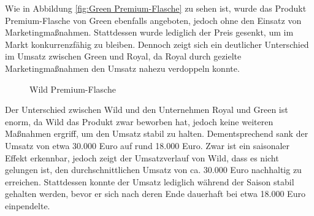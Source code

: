 \documentclass[a4paper,12pt]{article}
\begin{document}
Wie in Abbildung \ref{fig:Green Premium-Flasche} zu sehen ist, wurde das Produkt Premium-Flasche von Green ebenfalls angeboten, 
jedoch ohne den Einsatz von Marketingmaßnahmen.
Stattdessen wurde lediglich der Preis gesenkt, um im Markt konkurrenzfähig zu bleiben.
Dennoch zeigt sich ein deutlicher Unterschied im Umsatz zwischen Green und Royal,
da Royal durch gezielte Marketingmaßnahmen den Umsatz nahezu verdoppeln konnte.
\begin{figure}[H]
    \centering
    \caption{Wild Premium-Flasche}
    \label{fig:Wild Premium-Flasche}
\end{figure}
Der Unterschied zwischen Wild und den Unternehmen Royal und Green ist enorm, da Wild das Produkt zwar beworben hat,
jedoch keine weiteren Maßnahmen ergriff, um den Umsatz stabil zu halten.
Dementsprechend sank der Umsatz von etwa 30.000 Euro auf rund 18.000 Euro.
Zwar ist ein saisonaler Effekt erkennbar, jedoch zeigt der Umsatzverlauf von Wild, dass es nicht gelungen ist,
den durchschnittlichen Umsatz von ca. 30.000 Euro nachhaltig zu erreichen.
Stattdessen konnte der Umsatz lediglich während der Saison stabil gehalten werden,
bevor er sich nach deren Ende dauerhaft bei etwa 18.000 Euro einpendelte.
\end{document}
